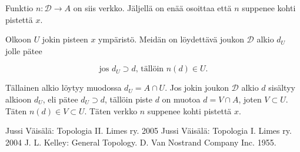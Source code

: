 \documentclass[12pt,a4paper,leqno]{report}
\newcommand{\D}{\mathcal{D}}
\theoremstyle{plain}
\theoremstyle{definition}
\theoremstyle{remark}
\begin{document}
Funktio $n : \D \to A$ on siis verkko. Jäljellä on enää osoittaa että $n$ suppenee kohti pistettä $x$.

Olkoon $U$ jokin pisteen $x$ ympäristö. Meidän on löydettävä joukon $\D$ alkio $d_U$ jolle pätee

\begin{equation}
\text{jos } d_U \supset d \text{, tällöin } n(d) \in U\text{.}
\end{equation}

Tällainen alkio löytyy muodossa $d_U = A \cap U$. Jos jokin joukon $\D$ alkio $d$ sisältyy alkioon $d_U$, eli pätee $d_U \supset d$, tällöin piste $d$ on muotoa $d = V \cap A$, joten $V \subset U$. Täten $n(d) \in V \subset U$. Täten verkko $n$ suppenee kohti pistettä $x$.

\begin{thebibliography}{9}

Jussi Väisälä: Topologia II. Limes ry. 2005
Jussi Väisälä: Topologia I. Limes ry. 2004
J. L. Kelley: General Topology. D. Van Nostrand Company Inc. 1955.
\end{thebibliography}
\end{document}
